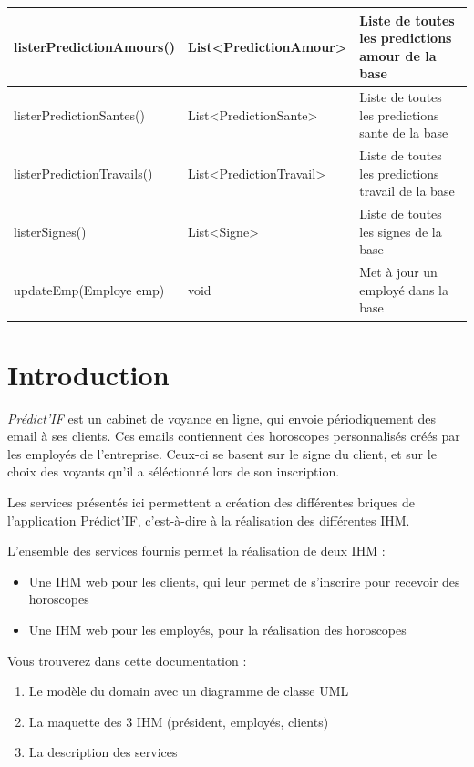 \documentclass[letterpaper,10pt,french]{sphinxmanual}
\begin{document}
\begin{tabulary}{\linewidth}{|L|L|L|}
\hline
listerPredictionAmours()
 & 
List\textless{}PredictionAmour\textgreater{}
 & 
Liste de toutes les predictions amour de la base
\\
\hline
listerPredictionSantes()
 & 
List\textless{}PredictionSante\textgreater{}
 & 
Liste de toutes les predictions sante de la base
\\
\hline
listerPredictionTravails()
 & 
List\textless{}PredictionTravail\textgreater{}
 & 
Liste de toutes les predictions travail de la base
\\
\hline
listerSignes()
 & 
List\textless{}Signe\textgreater{}
 & 
Liste de toutes les signes de la base
\\
\hline
updateEmp(Employe emp)
 & 
void
 & 
Met à jour un employé dans la base
\\
\hline\end{tabulary}



\chapter{Introduction}
\label{index:introduction}
\emph{Prédict’IF} est un cabinet de voyance en ligne, qui envoie périodiquement des email à ses clients. Ces emails contiennent des horoscopes personnalisés créés par les employés de l'entreprise. Ceux-ci se basent sur le signe du client, et sur le choix des voyants qu'il a séléctionné lors de son inscription.

Les services présentés ici permettent a création des différentes briques de l'application Prédict’IF, c'est-à-dire à la réalisation des différentes IHM.

L'ensemble des services fournis permet la réalisation de deux IHM :
\begin{itemize}
\item {} 
Une IHM web pour les clients, qui leur permet de s'inscrire pour recevoir des horoscopes

\item {} 
Une IHM web pour les employés, pour la réalisation des horoscopes

\end{itemize}

Vous trouverez dans cette documentation :
\begin{enumerate}
\item {} 
Le modèle du domain avec un diagramme de classe UML

\item {} 
La maquette des 3 IHM (président, employés, clients)

\item {} 
La description des services

\end{enumerate}



\renewcommand{\indexname}{Index}
\printindex
\end{document}

